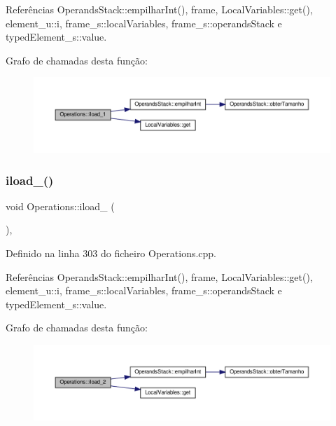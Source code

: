 Referências Operands\+Stack\+::empilhar\+Int(), frame, Local\+Variables\+::get(), element\+\_\+u\+::i, frame\+\_\+s\+::local\+Variables, frame\+\_\+s\+::operands\+Stack e typed\+Element\+\_\+s\+::value.

Grafo de chamadas desta função\+:
\nopagebreak
\begin{figure}[H]
\begin{center}
\leavevmode
\includegraphics[width=350pt]{classOperations_a4b9d8ef21894c0db2203c06712e97765_cgraph}
\end{center}
\end{figure}
\mbox{\label{classOperations_affa5afeadb98117ea0ee66cf2687eb0a}} 
\subsubsection{\texorpdfstring{iload\+\_()}{iload\_2()}}
{\footnotesize\ttfamily void Operations\+::iload\+\_ (\begin{DoxyParamCaption}{ }\end{DoxyParamCaption})\hspace{0.3cm}{\ttfamily [static]}, {\ttfamily [private]}}



Definido na linha 303 do ficheiro Operations.\+cpp.



Referências Operands\+Stack\+::empilhar\+Int(), frame, Local\+Variables\+::get(), element\+\_\+u\+::i, frame\+\_\+s\+::local\+Variables, frame\+\_\+s\+::operands\+Stack e typed\+Element\+\_\+s\+::value.

Grafo de chamadas desta função\+:
\nopagebreak
\begin{figure}[H]
\begin{center}
\leavevmode
\includegraphics[width=350pt]{classOperations_affa5afeadb98117ea0ee66cf2687eb0a_cgraph}
\end{center}
\end{figure}
\mbox{\label{classOperations_a3f645534291129289ee71c708dbe633c}} 

